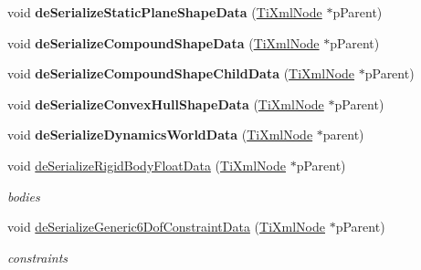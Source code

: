 \begin{DoxyCompactItemize}
\item 
\hypertarget{classbt_bullet_xml_world_importer_a9e10413c96087678b01b08eb4d1c142b}{void {\bfseries de\+Serialize\+Static\+Plane\+Shape\+Data} (\hyperlink{class_ti_xml_node}{Ti\+Xml\+Node} $\ast$p\+Parent)}\label{classbt_bullet_xml_world_importer_a9e10413c96087678b01b08eb4d1c142b}

\item 
\hypertarget{classbt_bullet_xml_world_importer_a89cf7faac17f888ba663e2d693dd3ab2}{void {\bfseries de\+Serialize\+Compound\+Shape\+Data} (\hyperlink{class_ti_xml_node}{Ti\+Xml\+Node} $\ast$p\+Parent)}\label{classbt_bullet_xml_world_importer_a89cf7faac17f888ba663e2d693dd3ab2}

\item 
\hypertarget{classbt_bullet_xml_world_importer_a22f0f1ff94928e6c57c52ebe548b3f32}{void {\bfseries de\+Serialize\+Compound\+Shape\+Child\+Data} (\hyperlink{class_ti_xml_node}{Ti\+Xml\+Node} $\ast$p\+Parent)}\label{classbt_bullet_xml_world_importer_a22f0f1ff94928e6c57c52ebe548b3f32}

\item 
\hypertarget{classbt_bullet_xml_world_importer_a8df1b2d18ceba5100af00c7d527117f8}{void {\bfseries de\+Serialize\+Convex\+Hull\+Shape\+Data} (\hyperlink{class_ti_xml_node}{Ti\+Xml\+Node} $\ast$p\+Parent)}\label{classbt_bullet_xml_world_importer_a8df1b2d18ceba5100af00c7d527117f8}

\item 
\hypertarget{classbt_bullet_xml_world_importer_a6620bfde0c22b7f5cf253bec4d875c63}{void {\bfseries de\+Serialize\+Dynamics\+World\+Data} (\hyperlink{class_ti_xml_node}{Ti\+Xml\+Node} $\ast$parent)}\label{classbt_bullet_xml_world_importer_a6620bfde0c22b7f5cf253bec4d875c63}

\item 
\hypertarget{classbt_bullet_xml_world_importer_a783cb49de654159302a6afd8cc634756}{void \hyperlink{classbt_bullet_xml_world_importer_a783cb49de654159302a6afd8cc634756}{de\+Serialize\+Rigid\+Body\+Float\+Data} (\hyperlink{class_ti_xml_node}{Ti\+Xml\+Node} $\ast$p\+Parent)}\label{classbt_bullet_xml_world_importer_a783cb49de654159302a6afd8cc634756}

\begin{DoxyCompactList}\small\item\em bodies \end{DoxyCompactList}\item 
\hypertarget{classbt_bullet_xml_world_importer_a6b6da81359ce72cd0cef112a42ab9b8d}{void \hyperlink{classbt_bullet_xml_world_importer_a6b6da81359ce72cd0cef112a42ab9b8d}{de\+Serialize\+Generic6\+Dof\+Constraint\+Data} (\hyperlink{class_ti_xml_node}{Ti\+Xml\+Node} $\ast$p\+Parent)}\label{classbt_bullet_xml_world_importer_a6b6da81359ce72cd0cef112a42ab9b8d}

\begin{DoxyCompactList}\small\item\em constraints \end{DoxyCompactList}\end{DoxyCompactItemize}
